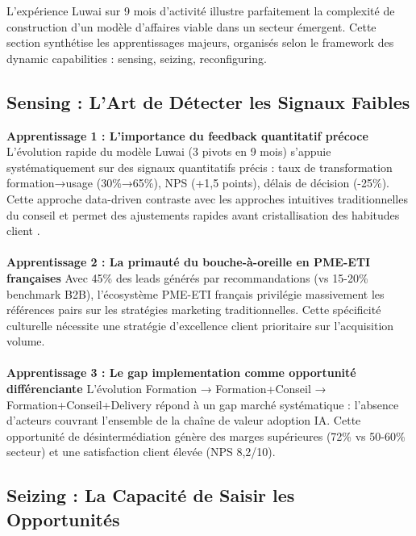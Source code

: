 L'expérience Luwai sur 9 mois d'activité illustre parfaitement la complexité de construction d'un modèle d'affaires viable dans un secteur émergent. Cette section synthétise les apprentissages majeurs, organisés selon le framework des dynamic capabilities \cite{teece2007dynamic} : sensing, seizing, reconfiguring.

\subsection{Sensing : L'Art de Détecter les Signaux Faibles}

\textbf{Apprentissage 1 : L'importance du feedback quantitatif précoce}
L'évolution rapide du modèle Luwai (3 pivots en 9 mois) s'appuie systématiquement sur des signaux quantitatifs précis : taux de transformation formation→usage (30\%→65\%), NPS (+1,5 points), délais de décision (-25\%). Cette approche data-driven contraste avec les approches intuitives traditionnelles du conseil et permet des ajustements rapides avant cristallisation des habitudes client \cite{ries2011lean}.
\\\\
\textbf{Apprentissage 2 : La primauté du bouche-à-oreille en PME-ETI françaises}
Avec 45\% des leads générés par recommandations (vs 15-20\% benchmark B2B), l'écosystème PME-ETI français privilégie massivement les références pairs sur les stratégies marketing traditionnelles. Cette spécificité culturelle \cite{hofstede2001culture} nécessite une stratégie d'excellence client prioritaire sur l'acquisition volume.
\\\\
\textbf{Apprentissage 3 : Le gap implementation comme opportunité différenciante}
L'évolution Formation → Formation+Conseil → Formation+Conseil+Delivery répond à un gap marché systématique : l'absence d'acteurs couvrant l'ensemble de la chaîne de valeur adoption IA. Cette opportunité de désintermédiation génère des marges supérieures (72\% vs 50-60\% secteur) et une satisfaction client élevée (NPS 8,2/10).

\subsection{Seizing : La Capacité de Saisir les Opportunités}

